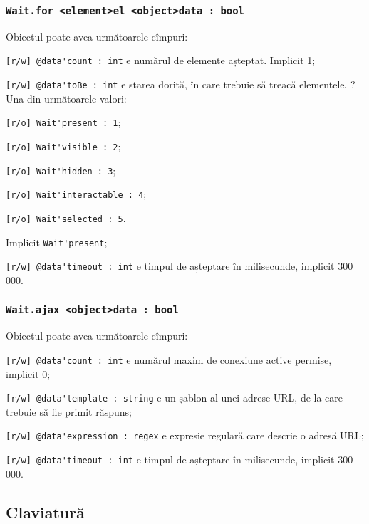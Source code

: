 \subsubsection{\lstinline|Wait.for <element>el <object>data : bool|}

Obiectul  poate avea următoarele cîmpuri:
\begin{icItems}
	\item \lstinline|[r/w] @data'count : int| e numărul de elemente așteptat. Implicit 1;
	\item \lstinline|[r/w] @data'toBe : int| e starea dorită, în care trebuie să treacă elementele. ?Una din următoarele valori:
	\begin{icItems}
		\item \lstinline|[r/o] Wait'present : 1|;
		\item \lstinline|[r/o] Wait'visible : 2|;
		\item \lstinline|[r/o] Wait'hidden : 3|;
		\item \lstinline|[r/o] Wait'interactable : 4|;
		\item \lstinline|[r/o] Wait'selected : 5|.
	\end{icItems}
	Implicit \lstinline|Wait'present|;
	\item \lstinline|[r/w] @data'timeout : int| e timpul de așteptare în milisecunde, implicit 300 000.
\end{icItems}

\subsubsection{\lstinline|Wait.ajax <object>data : bool|}

Obiectul  poate avea următoarele cîmpuri:
\begin{icItems}
	\item \lstinline|[r/w] @data'count : int| e numărul maxim de conexiune active permise, implicit 0;
	\item \lstinline|[r/w] @data'template : string| e un șablon al unei adrese URL, de la care trebuie să fie primit răspuns;
	\item \lstinline|[r/w] @data'expression : regex| e expresie regulară care descrie o adresă URL;
	\item \lstinline|[r/w] @data'timeout : int| e timpul de așteptare în milisecunde, implicit 300 000.
\end{icItems}

\subsection{Claviatură}

